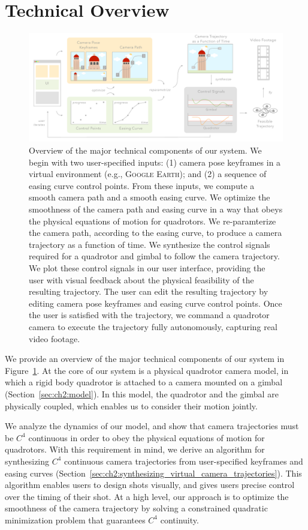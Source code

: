 \section{Technical Overview}

\begin{figure}[t]
\centering
\includegraphics[width=6.0in]{images/2015_siggraph_asia/system_overview}
\caption{
Overview of the major technical components of our system.
We begin with two user-specified inputs: (1) camera pose keyframes in a virtual environment (e.g., \textsc{Google Earth}); and (2) a sequence of easing curve control points.
From these inputs, we compute a smooth camera path and a smooth easing curve.
We optimize the smoothness of the camera path and easing curve in a way that obeys the physical equations of motion for quadrotors.
We re-paramterize the camera path, according to the easing curve, to produce a camera trajectory as a function of time.
We synthesize the control signals required for a quadrotor and gimbal to follow the camera trajectory.
We plot these control signals in our user interface, providing the user with visual feedback about the physical feasibility of the resulting trajectory.
The user can edit the resulting trajectory by editing camera pose keyframes and easing curve control points.
Once the user is satisfied with the trajectory, we command a quadrotor camera to execute the trajectory fully autonomously, capturing real video footage.
}
\label{figure:overview}
\end{figure}

We provide an overview of the major technical components of our system in Figure~\ref{figure:overview}.
At the core of our system is a physical quadrotor camera model, in which a rigid body quadrotor is attached to a camera mounted on a gimbal (Section~\ref{sec:ch2:model}).
In this model, the quadrotor and the gimbal are physically coupled, which enables us to consider their motion jointly.

We analyze the dynamics of our model, and show that camera trajectories must be $C^4$ continuous in order to obey the physical equations of motion for quadrotors.
With this requirement in mind, we derive an algorithm for synthesizing $C^4$ continuous camera trajectories from user-specified keyframes and easing curves (Section~\ref{sec:ch2:synthesizing_virtual_camera_trajectories}).
This algorithm enables users to design shots visually, and gives users precise control over the timing of their shot.
At a high level, our approach is to optimize the smoothness of the camera trajectory by solving a constrained quadratic minimization problem that guarantees $C^4$ continuity.

